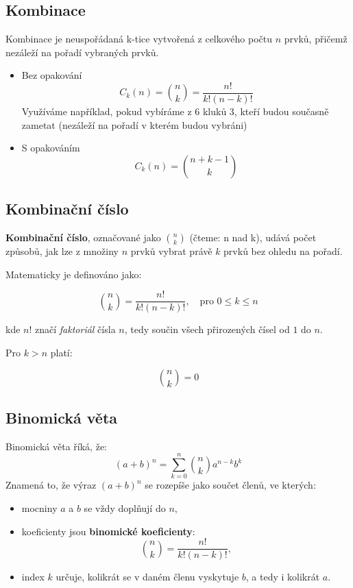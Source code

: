      \subsection{Kombinace}
     Kombinace je neuspořádaná k-tice vytvořená z celkového počtu $n$ prvků, přičemž nezáleží na pořadí vybraných prvků.
     \begin{itemize}
         \item Bez opakování
         $$
         C_k (n)= {n \choose k}=\frac{n!}{k!(n-k)!}
         $$
         Využíváme například, pokud vybíráme z 6 kluků 3, kteří budou současně zametat (nezáleží na pořadí v kterém budou vybráni)
         \item S opakováním
         $$
         C_k(n)= {n+k-1 \choose k}
         $$
     \end{itemize}
     
     \subsection{Kombinační číslo}
     \textbf{Kombinační číslo}, označované jako $\binom{n}{k}$ (čteme: n nad k), udává počet způsobů, jak lze z množiny $n$ prvků vybrat právě $k$ prvků bez ohledu na pořadí.

Matematicky je definováno jako:

\[
\binom{n}{k} = \frac{n!}{k!(n-k)!}, \quad \text{pro } 0 \leq k \leq n
\]

kde $n!$ značí \textit{faktoriál} čísla $n$, tedy součin všech přirozených čísel od $1$ do $n$.

Pro $k > n$ platí:

\[
\binom{n}{k} = 0
\]
     \subsection{Binomická věta}
     Binomická věta říká, že:
     $$
        (a + b)^n = \sum_{k=0}^{n} \binom{n}{k} a^{n-k} b^k
     $$
     Znamená to, že výraz $(a + b)^n$ se rozepíše jako součet členů, ve kterých:

\begin{itemize}
  \item mocniny $a$ a $b$ se vždy doplňují do $n$,
  \item koeficienty jsou \textbf{binomické koeficienty}: 
  \[
  \binom{n}{k} = \frac{n!}{k!(n-k)!},
  \]
  \item index $k$ určuje, kolikrát se v daném členu vyskytuje $b$, a tedy i kolikrát $a$.
\end{itemize}

